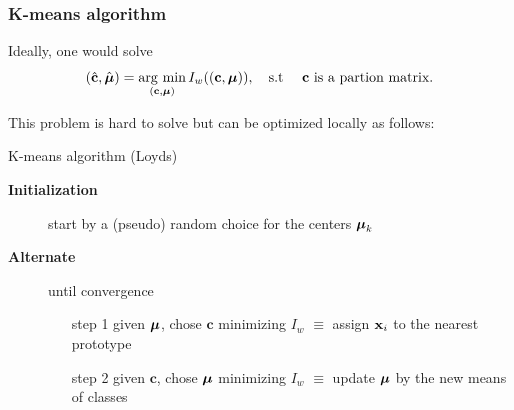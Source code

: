 \documentclass{beamer}\usepackage[]{graphicx}\usepackage[]{color}
\begin{document}
\begin{frame}
  \frametitle{K-means algorithm}
  
  Ideally, one would solve
  \begin{equation*}
    (\hat{\mathbf{c}}, \hat{\boldsymbol{\mu}}) = \mathop{\mathrm{arg\ min}}_{(\mathbf{c}, \boldsymbol{\mu})}  I_w((\mathbf{c}, \boldsymbol{\mu})), \quad \text{s.t \quad $\mathbf{c}$ is a partion matrix}.
  \end{equation*}
  
  This problem is hard to solve but can be optimized locally as follows:

  \vfill
  
  \begin{block}{K-means algorithm (Loyds)}
  \begin{description}
    \item[\textbf{Initialization}] start by a (pseudo) random choice for the centers $\boldsymbol{\mu}_k$
    \item[\textbf{Alternate}] until convergence
      \begin{enumerate}
        \item[step 1] given $\boldsymbol{\mu}$, chose $\mathbf{c}$ minimizing $I_w$ $\equiv$ assign $\mathbf{x}_i$ to the nearest prototype
        \item[step 2] given $\mathbf{c}$, chose $\boldsymbol{\mu}$ minimizing $I_w$ $\equiv$ update $\boldsymbol{\mu}$ by the new means of classes
      \end{enumerate}
    \end{description}
  \end{block}

\end{frame}
\end{document}
